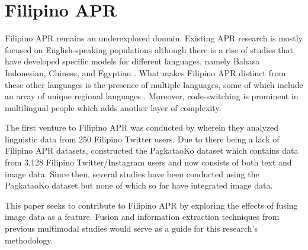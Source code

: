 \section{Filipino APR}
\label{sec: FilipinoAPR}
Filipino APR remains an underexplored domain. Existing APR research is mostly focused on English-speaking populations although there is a rise of studies that have developed specific models for different languages, namely Bahasa Indonesian, Chinese, and Egyptian \citep{Siddique2019, Salem2019, Adi2018}. What makes Filipino APR distinct from these other languages is the presence of multiple languages, some of which include an array of unique regional languages \citep{Tighe_Acorda_Agno_Gano_Go_Santiago_Sedillo_2022,tighe_modeling_2018}. Moreover, code-switching is prominent in multilingual people which adds another layer of complexity.

The first venture to Filipino APR was conducted by \citet{tighe_modeling_2018} wherein they analyzed linguistic data from 250 Filipino Twitter users. Due to there being a lack of Filipino APR datasets, \citet{Tighe_Acorda_Agno_Gano_Go_Santiago_Sedillo_2022} constructed the PagkataoKo dataset which contains data from 3,128 Filipino Twitter/Instagram users and now consists of both text and image data. Since then, several studies have been conducted using the PagkataoKo dataset but none of which so far have integrated image data.

This paper seeks to contribute to Filipino APR by exploring the effects of fusing image data as a feature. Fusion and information extraction techniques from previous multimodal studies would serve as a guide for this research’s methodology.




